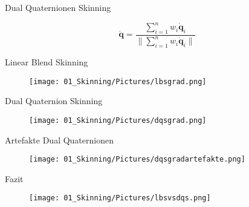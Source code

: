 		\begin{frame}{\Huge{Dual Quaternionen Skinning}}
			
			$$\mathbf{\dot q} =  \frac{\sum_{i=1}^n w_i \mathbf{\dot q}_i}{\| \sum_{i=1}^n w_i \mathbf{\dot q}_i \|}$$
			
			
		\end{frame}
		
				\begin{frame}{\Huge{Linear Blend Skinning}}
					
					\begin{figure}
						\texttt{[image: 01\_Skinning/Pictures/lbsgrad.png]}
					\end{figure}
					
					
					
				\end{frame}
				
						\begin{frame}{\Huge{Dual Quaternion Skinning}}
							
							\begin{figure}
								\texttt{[image: 01\_Skinning/Pictures/dqsgrad.png]}
							\end{figure}
							
							
							
						\end{frame}
						
				\begin{frame}{\Huge{Artefakte Dual Quaternionen}}
					
					\begin{figure}
						\texttt{[image: 01\_Skinning/Pictures/dqsgradartefakte.png]}
					\end{figure}
					
					
					
				\end{frame}
				
					\begin{frame}{\Huge{Fazit}}
							
							\begin{figure}
								\texttt{[image: 01\_Skinning/Pictures/lbsvsdqs.png]}
							\end{figure}
							
							
					
						\end{frame}
		
